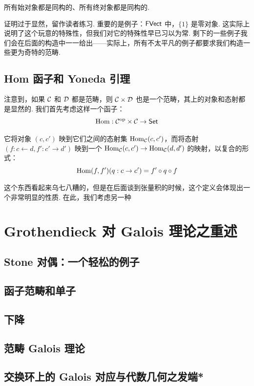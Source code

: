 \begin{theorem}{}{}
    所有始对象都是同构的、所有终对象都是同构的.
\end{theorem}

证明过于显然，留作读者练习. 重要的是例子：$\mathsf{FVect}$ 中，$\{1\}$ 是零对象. 这实际上说明了这个玩意的特殊性，但我们对它的特殊性早已习以为常. 剩下的一些例子我们会在后面的构造中一一给出——实际上，所有不太平凡的例子都要求我们构造一些更为奇特的范畴.

\subsection{Hom 函子和 Yoneda 引理}

注意到，如果 $\mathcal{C}$ 和 $\mathcal{D}$ 都是范畴，则 $\mathcal{C} \times \mathcal{D}$ 也是一个范畴，其上的对象和态射都是显然的. 我们首先考虑这样一个函子：
\[
    \operatorname{Hom}: \mathcal{C}^\mathrm{op} \times \mathcal{C} \to \mathsf{Set}
\]

它将对象 $(c, c')$ 映到它们之间的态射集 $\operatorname{Hom}_{\mathcal{C}}(c, c')$，而将态射 $(f: c \leftarrow d, f': c' \to d')$ 映到一个 $\operatorname{Hom}_{\mathcal{C}}(c, c') \to \operatorname{Hom}_{\mathcal{C}}(d, d')$ 的映射，以复合的形式：
\[
    \operatorname{Hom}(f, f')(q: c \to c') = f' \circ q \circ f
\]

这个东西看起来乌七八糟的，但是在后面谈到张量积的时候，这个定义会体现出一个非常明显的性质. 在此，我们考虑另一种

\section{Grothendieck 对 Galois 理论之重述}

\subsection{Stone 对偶：一个轻松的例子}

\subsection{函子范畴和单子}

\subsection{下降}

\subsection{范畴 Galois 理论}

\subsection{交换环上的 Galois 对应与代数几何之发端*}

